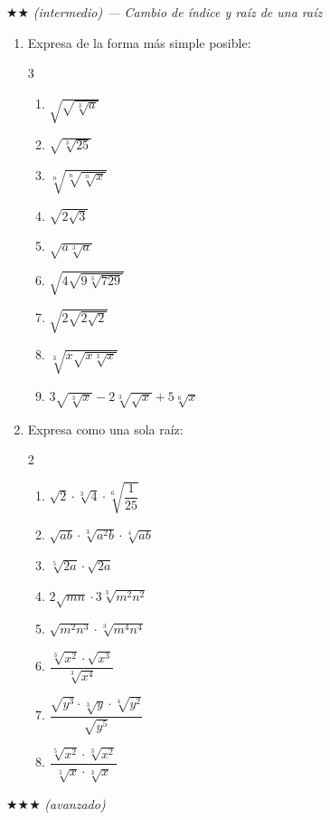 \documentclass[11pt, letterpaper]{article}
\begin{document}
$\bigstar\bigstar$ \textit{(intermedio) — Cambio de índice y raíz de una raíz}

\begin{enumerate}[label=\textbf{\arabic*.}, leftmargin=*, resume]
  \item Expresa de la forma más simple posible:
  \begin{multicols}{3}
  \begin{enumerate}[label=\alph*)]
    \item $\sqrt{\sqrt{\sqrt[3]{a}}}$
    \item $\sqrt{\sqrt[3]{25}}$
    \item $\sqrt[n]{\sqrt[n]{\sqrt[n]{x}}}$
    \item $\sqrt{2\sqrt{3}}$
    \item $\sqrt{a\sqrt[3]{a}}$
    \item $\sqrt{4\sqrt{9\sqrt[3]{729}}}$
    \item $\sqrt{2\sqrt{2\sqrt{2}}}$
    \item $\sqrt[3]{x\sqrt{x\sqrt[3]{x}}}$
    \item $3\sqrt{\sqrt[3]{x}}-2\sqrt[3]{\sqrt{x}}+5\sqrt[6]{x}$
  \end{enumerate}
  \end{multicols}

  \item Expresa como una sola raíz:
  \begin{multicols}{2}
  \begin{enumerate}[label=\alph*)]
    \item $\sqrt{2}\cdot\sqrt[3]{4}\cdot\sqrt[6]{\dfrac{1}{25}}$
    \item $\sqrt{ab}\cdot\sqrt[3]{a^2b}\cdot\sqrt[4]{ab}$
    \item $\sqrt[5]{2a}\cdot\sqrt{2a}$
    \item $2\sqrt{mn}\cdot 3\sqrt[3]{m^2n^2}$
    \item $\sqrt{m^2n^3}\cdot\sqrt[3]{m^4n^4}$
    \item $\dfrac{\sqrt[3]{x^2}\cdot\sqrt{x^3}}{\sqrt[3]{x^4}}$
    \item $\dfrac{\sqrt{y^3}\cdot\sqrt[3]{y}\cdot\sqrt[4]{y^2}}{\sqrt{y^5}}$
    \item $\dfrac{\sqrt[5]{x^2}\cdot\sqrt[3]{x^2}}{\sqrt[5]{x}\cdot\sqrt[3]{x}}$
  \end{enumerate}
  \end{multicols}
\end{enumerate}

$\bigstar\bigstar\bigstar$ \textit{(avanzado)}
\end{document}
